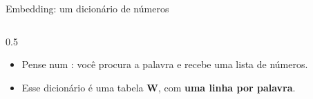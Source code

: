 \begin{frame}{Embedding: um dicionário de números}
    \begin{columns}[T]
        \begin{column}{0.5\textwidth}
            \small
            \begin{itemize}
                \item Pense num : você procura a palavra e recebe uma lista de números.
                \item Esse dicionário é uma tabela $\mathbf{W}$, com \textbf{uma linha por palavra}.
            \end{itemize}



\end{column}
\end{columns}
\end{frame}

